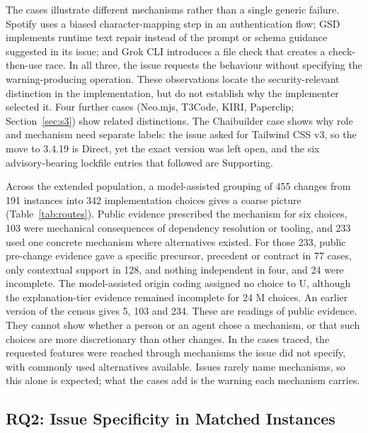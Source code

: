 \documentclass[acmsmall,screen,nonacm]{acmart}
\begin{document}
The cases illustrate different mechanisms rather than a single generic failure. Spotify uses a biased character-mapping step in an authentication flow; GSD implements runtime text repair instead of the prompt or schema guidance suggested in its issue; and Grok CLI introduces a file check that creates a check-then-use race. In all three, the issue requests the behaviour without specifying the warning-producing operation. These observations locate the security-relevant distinction in the implementation, but do not establish why the implementer selected it. Four further cases (Neo.mjs, T3Code, KIRI, Paperclip; Section~\ref{sec:s3}) show related distinctions. The Chaibuilder case shows why role and mechanism need separate labels: the issue asked for Tailwind CSS v3, so the move to 3.4.19 is Direct, yet the exact version was left open, and the six advisory-bearing lockfile entries that followed are Supporting.

Across the extended population, a model-assisted grouping of 455 changes from 191 instances into 342 implementation choices gives a coarse picture (Table~\ref{tab:routes}). Public evidence prescribed the mechanism for six choices, 103 were mechanical consequences of dependency resolution or tooling, and 233 used one concrete mechanism where alternatives existed. For those 233, public pre-change evidence gave a specific precursor, precedent or contract in 77 cases, only contextual support in 128, and nothing independent in four, and 24 were incomplete. The model-assisted origin coding assigned no choice to U, although the explanation-tier evidence remained incomplete for 24 M choices. An earlier version of the census gives 5, 103 and 234. These are readings of public evidence. They cannot show whether a person or an agent chose a mechanism, or that such choices are more discretionary than other changes. In the cases traced, the requested features were reached through mechanisms the issue did not specify, with commonly used alternatives available. Issues rarely name mechanisms, so this alone is expected; what the cases add is the warning each mechanism carries.

\subsection{RQ2: Issue Specificity in Matched Instances}\label{sec:rq2-res}
\end{document}
